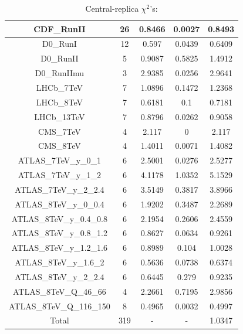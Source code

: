 \documentclass[
]{article}
\begin{document}
\begin{table}[h]
\begin{tabular}{|c|c|c|c|c|}
CDF\_RunII & 26 & 0.8466 & 0.0027 & 0.8493 \\ \hline
D0\_RunI & 12 & 0.597 & 0.0439 & 0.6409 \\ \hline
D0\_RunII & 5 & 0.9087 & 0.5825 & 1.4912 \\ \hline
D0\_RunIImu & 3 & 2.9385 & 0.0256 & 2.9641 \\ \hline
LHCb\_7TeV & 7 & 1.0896 & 0.1472 & 1.2368 \\ \hline
LHCb\_8TeV & 7 & 0.6181 & 0.1 & 0.7181 \\ \hline
LHCb\_13TeV & 7 & 0.8796 & 0.0262 & 0.9058 \\ \hline
CMS\_7TeV & 4 & 2.117 & 0 & 2.117 \\ \hline
CMS\_8TeV & 4 & 1.4011 & 0.0071 & 1.4082 \\ \hline
ATLAS\_7TeV\_y\_0\_1 & 6 & 2.5001 & 0.0276 & 2.5277 \\ \hline
ATLAS\_7TeV\_y\_1\_2 & 6 & 4.1178 & 1.0352 & 5.1529 \\ \hline
ATLAS\_7TeV\_y\_2\_2.4 & 6 & 3.5149 & 0.3817 & 3.8966 \\ \hline
ATLAS\_8TeV\_y\_0\_0.4 & 6 & 1.9202 & 0.3487 & 2.2689 \\ \hline
ATLAS\_8TeV\_y\_0.4\_0.8 & 6 & 2.1954 & 0.2606 & 2.4559 \\ \hline
ATLAS\_8TeV\_y\_0.8\_1.2 & 6 & 0.8627 & 0.0634 & 0.9261 \\ \hline
ATLAS\_8TeV\_y\_1.2\_1.6 & 6 & 0.8989 & 0.104 & 1.0028 \\ \hline
ATLAS\_8TeV\_y\_1.6\_2 & 6 & 0.5636 & 0.0738 & 0.6374 \\ \hline
ATLAS\_8TeV\_y\_2\_2.4 & 6 & 0.6445 & 0.279 & 0.9235 \\ \hline
ATLAS\_8TeV\_Q\_46\_66 & 4 & 2.2661 & 0.7195 & 2.9856 \\ \hline
ATLAS\_8TeV\_Q\_116\_150 & 8 & 0.4965 & 0.0032 & 0.4997 \\ \hline
Total & 319 & - & - & 1.0347 \\ \hline

\end{tabular}

\caption{Central-replica \(\chi^2\)'s:}

\end{table}
\end{document}
